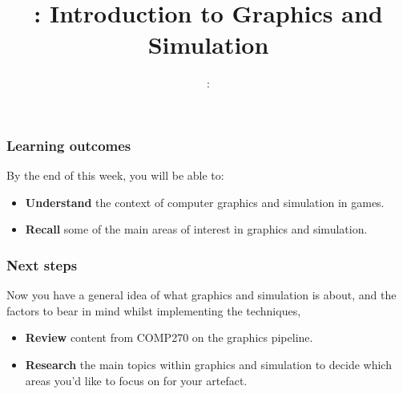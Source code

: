 \usepackage{../../beamerthemeFalmouthGamesAcademy}
\usepackage{multimedia}
\graphicspath{ {../../} }


\usepackage[normalem]{ulem}
\usepackage{wasysym}

\usepackage{pdfpages}

\usepackage[skip=2pt,font=tiny]{caption}

\usetikzlibrary{arrows,automata}

\hypersetup{
	colorlinks=true,
	linkcolor=gray,
	urlcolor=gray
}




\title{\sessionnumber: Introduction to Graphics and Simulation}
\subtitle{\modulecode: \moduletitle}

\frame{\titlepage} 

\begin{frame}
	\frametitle{Learning outcomes}
	By the end of this week, you will be able to:
	\begin{itemize}
		\item \textbf{Understand} the context of computer graphics and simulation in games.
		\item \textbf{Recall} some of the main areas of interest in graphics and simulation.
	\end{itemize}
\end{frame}







\begin{frame}
	\frametitle{Next steps}
	Now you have a general idea of what graphics and simulation is about, and the factors to bear in mind whilst implementing the techniques,
	\begin{itemize}
		\item \textbf{Review} content from COMP270 on the graphics pipeline.
		\item \textbf{Research} the main topics within graphics and simulation to decide which areas you'd like to focus on for your artefact.
	\end{itemize}
\end{frame}


